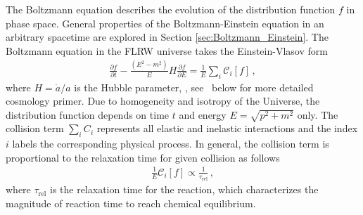 The Boltzmann equation describes the evolution of the distribution function $f$ in phase space. General properties of the Boltzmann-Einstein equation in an arbitrary spacetime are explored in Section \ref{sec:Boltzmann_Einstein}. The Boltzmann equation in the FLRW universe takes the Einstein-Vlasov form
\begin{align}\label{Hubble:Boltzmann}
\frac{\partial f}{\partial t}-\frac{\left(E^2-m^2\right)}{E}H\frac{\partial f}{\partial E}=\frac{1}{E}\sum_{i}\mathcal{C}_i[f]\,,
\end{align}
where $H=\dot{a}/a$ is the Hubble parameter, , see~ below for more detailed cosmology primer. Due to homogeneity and isotropy of the Universe, the distribution function depends on time $t$ and energy $E=\sqrt{p^2+m^2}$ only. The collision term $\sum_i C_i$ represents all elastic and inelastic interactions and the index $i$ labels the corresponding physical process. In general, the collision term is proportional to the relaxation time for given collision as follows~\cite{Anderson:1974nyl}
\begin{align}
\frac{1}{E}\mathcal{C}_i[f]\propto\frac{1}{\tau_\mathrm{rel}}\,,
\end{align}
where $\tau_\mathrm{rel}$ is the relaxation time for the reaction, which characterizes the magnitude of reaction time to reach chemical equilibrium. 

